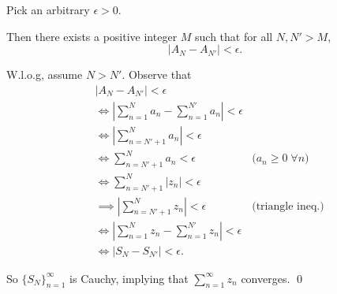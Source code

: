 \documentclass[oneside]{article}
\newcommand\abs[1]{\left|#1\right|}
\begin{document}
\begin{enumerate}[label=\textbf{(\alph*)}]
      Pick an arbitrary $\epsilon > 0$.

      Then there exists a positive integer $M$ such that for all $N, N' > M$,\[
        \abs{A_N - A_{N'}} < \epsilon\text{.}
      \]

      W.l.o.g, assume $N > N'$. Observe that \begin{align*}
        &\abs{A_N - A_{N'}} < \epsilon \\
        &\iff \abs{\sum_{n=1}^N a_n - \sum_{n=1}^{N'} a_n} < \epsilon \\
        &\iff \abs{\sum_{n=N'+1}^N a_n} < \epsilon \\
        &\iff \sum_{n=N'+1}^N a_n < \epsilon
          & \text{($a_n \geq 0 \;\forall n$)}\\
        &\iff \sum_{n=N'+1}^N \abs{z_n} < \epsilon \\
        &\implies \abs{\sum_{n=N'+1}^N z_n} < \epsilon
          & \text{(triangle ineq.)}\\
        &\iff \abs{\sum_{n=1}^N z_n - \sum_{n=1}^{N'} z_n} < \epsilon \\
        &\iff \abs{S_N - S_{N'}} < \epsilon\text{.}
      \end{align*}

      So $\{S_N\}_{n=1}^\infty$ is Cauchy, implying that $\sum_{n=1}^\infty z_n$
      converges.
      \qed





  \end{enumerate}
\end{document}
